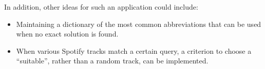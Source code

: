 \documentclass[12pt]{article}
\begin{document}
In addition, other ideas for such an application could include:

\begin{itemize}
\item Maintaining a dictionary of the most common abbreviations that
  can be used when no exact solution is found.

\item When various Spotify tracks match a certain query, a criterion
  to choose a ``suitable'', rather than a random track, can be
  implemented.
\end{itemize}
\end{document}
